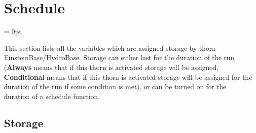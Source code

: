 
\section{Schedule} 


\parskip = 0pt


\noindent This section lists all the variables which are assigned storage by thorn EinsteinBase/HydroBase.  Storage can either last for the duration of the run ({\bf Always} means that if this thorn is activated storage will be assigned, {\bf Conditional} means that if this thorn is activated storage will be assigned for the duration of the run if some condition is met), or can be turned on for the duration of a schedule function.


\subsection*{Storage}

\hspace{5mm}

